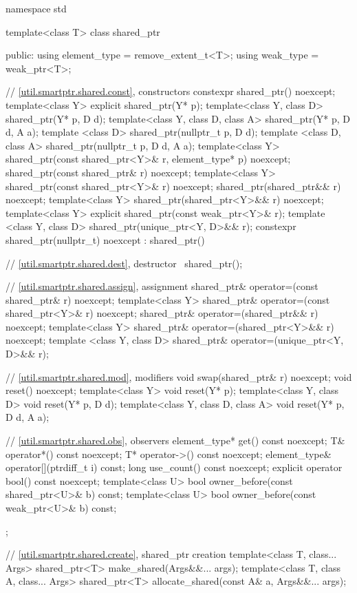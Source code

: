 \begin{codeblock}
namespace std {
  template<class T> class shared_ptr {
  public:
    using element_type = remove_extent_t<T>;
    using weak_type    = weak_ptr<T>;

    // \ref{util.smartptr.shared.const}, constructors
    constexpr shared_ptr() noexcept;
    template<class Y> explicit shared_ptr(Y* p);
    template<class Y, class D> shared_ptr(Y* p, D d);
    template<class Y, class D, class A> shared_ptr(Y* p, D d, A a);
    template <class D> shared_ptr(nullptr_t p, D d);
    template <class D, class A> shared_ptr(nullptr_t p, D d, A a);
    template<class Y> shared_ptr(const shared_ptr<Y>& r, element_type* p) noexcept;
    shared_ptr(const shared_ptr& r) noexcept;
    template<class Y> shared_ptr(const shared_ptr<Y>& r) noexcept;
    shared_ptr(shared_ptr&& r) noexcept;
    template<class Y> shared_ptr(shared_ptr<Y>&& r) noexcept;
    template<class Y> explicit shared_ptr(const weak_ptr<Y>& r);
    template <class Y, class D> shared_ptr(unique_ptr<Y, D>&& r);
    constexpr shared_ptr(nullptr_t) noexcept : shared_ptr() { }

    // \ref{util.smartptr.shared.dest}, destructor
    ~shared_ptr();

    // \ref{util.smartptr.shared.assign}, assignment
    shared_ptr& operator=(const shared_ptr& r) noexcept;
    template<class Y> shared_ptr& operator=(const shared_ptr<Y>& r) noexcept;
    shared_ptr& operator=(shared_ptr&& r) noexcept;
    template<class Y> shared_ptr& operator=(shared_ptr<Y>&& r) noexcept;
    template <class Y, class D> shared_ptr& operator=(unique_ptr<Y, D>&& r);

    // \ref{util.smartptr.shared.mod}, modifiers
    void swap(shared_ptr& r) noexcept;
    void reset() noexcept;
    template<class Y> void reset(Y* p);
    template<class Y, class D> void reset(Y* p, D d);
    template<class Y, class D, class A> void reset(Y* p, D d, A a);

    // \ref{util.smartptr.shared.obs}, observers
    element_type* get() const noexcept;
    T& operator*() const noexcept;
    T* operator->() const noexcept;
    element_type& operator[](ptrdiff_t i) const;
    long use_count() const noexcept;
    explicit operator bool() const noexcept;
    template<class U> bool owner_before(const shared_ptr<U>& b) const;
    template<class U> bool owner_before(const weak_ptr<U>& b) const;
  };

  // \ref{util.smartptr.shared.create}, shared_ptr creation
  template<class T, class... Args>
    shared_ptr<T> make_shared(Args&&... args);
  template<class T, class A, class... Args>
    shared_ptr<T> allocate_shared(const A& a, Args&&... args);

}
\end{codeblock}
